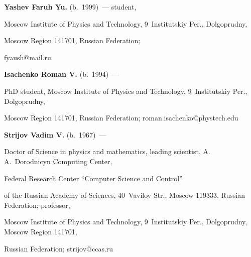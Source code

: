 \Contr



\noindent

\textbf{Yashev Faruh Yu.} (b.\ 1999)~--- student, 

Moscow Institute of Physics and Technology, 9~Institutskiy Per., Dolgoprudny, 

Moscow Region 141701, Russian Federation; 

\mbox{fyaush@mail.ru}



\vspace*{3pt}



\noindent

\textbf{Isachenko Roman V.} (b.\ 1994)~--- 

PhD student, Moscow Institute of Physics and Technology, 9~Institutskiy Per., Dolgoprudny, 

Moscow Region 141701, Russian Federation; \mbox{roman.isachenko@phystech.edu}



\vspace*{3pt}



\noindent

\textbf{Strijov Vadim V.} (b.\ 1967)~--- 

Doctor of Science in physics and mathematics, leading scientist, A.\,A.~Dorodnicyn Computing Center, 

Federal Research Center ``Computer Science and Control'' 

of the Russian Academy of Sciences, 40~Vavilov Str., Moscow 119333, Russian Federation; professor, 

Moscow Institute of Physics and Technology, 9~Institutskiy Per., Dolgoprudny, Moscow Region 141701, 

Russian Federation; \mbox{strijov@ccas.ru}



\label{end\stat}



\renewcommand{\bibname}{\protect\rm Литература}   


